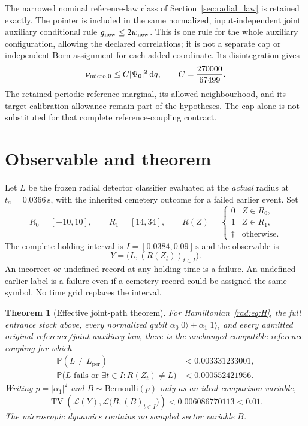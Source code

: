 \documentclass[11pt]{article}
\newtheorem{theorem}{Theorem}[section]
\theoremstyle{definition}\newtheorem{definition}[theorem]{Definition}
\theoremstyle{remark}\newtheorem{remark}[theorem]{Remark}
\newcommand{\Prob}{\mathbb P}\newcommand{\E}{\mathbb E}
\newcommand{\TV}{\operatorname{TV}}\newcommand{\Var}{\operatorname{Var}}
\newcommand{\dd}{\,\mathrm d}\newcommand{\Imv}{\operatorname{Im}}\newcommand{\ii}{\mathrm i}
\begin{document}
The narrowed nominal reference-law class of Section~\ref{sec:radial_law} is retained exactly. The pointer is
included in the same normalized, input-independent joint auxiliary
conditional rule $g_{\rm new}\leq2w_{\rm new}$. This is one rule for
the whole auxiliary configuration, allowing the declared correlations;
it is not a separate cap or independent Born assignment for each added
coordinate. Its disintegration gives
\begin{equation}\label{rad:eq:cap}
 \nu_{\rm micro,0}\leq C|\Psi_0|^2\dd q,
 \qquad C=\frac{270000}{67499}.
\end{equation}
The retained periodic reference marginal, its allowed neighbourhood, and
its target-calibration allowance remain part of the hypotheses. The cap
alone is not substituted for that complete reference-coupling contract.

\section{Observable and theorem}

Let $L$ be the frozen radial detector classifier evaluated at the
\emph{actual} radius at $t_a=0.0366\,\mathrm s$, with the inherited
cemetery outcome for a failed earlier event. Set
\[
 R_0=[-10,10],\qquad R_1=[14,34],\qquad
 R(Z)=\begin{cases}0&Z\in R_0,\\1&Z\in R_1,\\
 \dagger&\text{otherwise.}\end{cases}
\]
The complete holding interval is $I=[0.0384,0.09]\,\mathrm s$ and the
observable is
\[
 Y=\bigl(L,(R(Z_t))_{t\in I}\bigr).
\]
An incorrect or undefined record at any holding time is a failure.
An undefined earlier label is a failure even if a cemetery record could
be assigned the same symbol. No time grid replaces the interval.

\begin{theorem}[Effective joint-path theorem]\label{rad:thm:main}
For Hamiltonian~\eqref{rad:eq:H}, the full entrance stock above, every
normalized qubit $\alpha_0|0\rangle+\alpha_1|1\rangle$, and every admitted
original reference/joint auxiliary law, there is the unchanged compatible
reference coupling for which
\begin{align}
 \Prob(L\neq L_{\mathrm{per}})&<0.003331233001,\label{rad:eq:label}\\
 \Prob\bigl(L\text{ fails or }\exists t\in I:R(Z_t)\neq L\bigr)
      &<0.000552421956.\label{rad:eq:copy}
\end{align}
Writing $p=|\alpha_1|^2$ and $B\sim\mathrm{Bernoulli}(p)$ only as an
ideal comparison variable,
\begin{equation}\label{rad:eq:TV}
 \TV\!\left(\mathcal L(Y),
        \mathcal L\bigl(B,(B)_{t\in I}\bigr)\right)
       <0.006086770113<0.01.
\end{equation}
The microscopic dynamics contains no sampled sector variable $B$.
\end{theorem}
\end{document}
